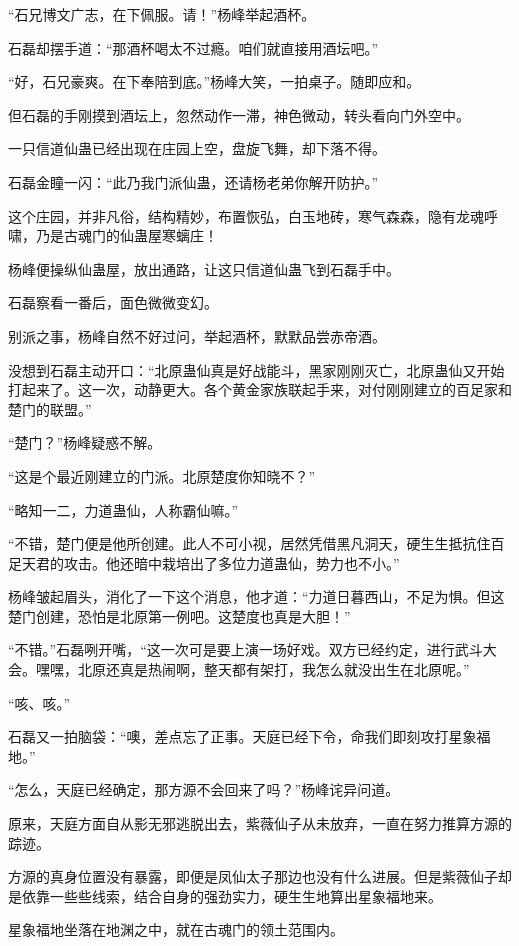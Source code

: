 \begin{this_body}
“石兄博文广志，在下佩服。请！”杨峰举起酒杯。

石磊却摆手道：“那酒杯喝太不过瘾。咱们就直接用酒坛吧。”

“好，石兄豪爽。在下奉陪到底。”杨峰大笑，一拍桌子。随即应和。

但石磊的手刚摸到酒坛上，忽然动作一滞，神色微动，转头看向门外空中。

一只信道仙蛊已经出现在庄园上空，盘旋飞舞，却下落不得。

石磊金瞳一闪：“此乃我门派仙蛊，还请杨老弟你解开防护。”

这个庄园，并非凡俗，结构精妙，布置恢弘，白玉地砖，寒气森森，隐有龙魂呼啸，乃是古魂门的仙蛊屋寒螭庄！

杨峰便操纵仙蛊屋，放出通路，让这只信道仙蛊飞到石磊手中。

石磊察看一番后，面色微微变幻。

别派之事，杨峰自然不好过问，举起酒杯，默默品尝赤帝酒。

没想到石磊主动开口：“北原蛊仙真是好战能斗，黑家刚刚灭亡，北原蛊仙又开始打起来了。这一次，动静更大。各个黄金家族联起手来，对付刚刚建立的百足家和楚门的联盟。”

“楚门？”杨峰疑惑不解。

“这是个最近刚建立的门派。北原楚度你知晓不？”

“略知一二，力道蛊仙，人称霸仙嘛。”

“不错，楚门便是他所创建。此人不可小视，居然凭借黑凡洞天，硬生生抵抗住百足天君的攻击。他还暗中栽培出了多位力道蛊仙，势力也不小。”

杨峰皱起眉头，消化了一下这个消息，他才道：“力道日暮西山，不足为惧。但这楚门创建，恐怕是北原第一例吧。这楚度也真是大胆！”

“不错。”石磊咧开嘴，“这一次可是要上演一场好戏。双方已经约定，进行武斗大会。嘿嘿，北原还真是热闹啊，整天都有架打，我怎么就没出生在北原呢。”

“咳、咳。”

石磊又一拍脑袋：“噢，差点忘了正事。天庭已经下令，命我们即刻攻打星象福地。”

“怎么，天庭已经确定，那方源不会回来了吗？”杨峰诧异问道。

原来，天庭方面自从影无邪逃脱出去，紫薇仙子从未放弃，一直在努力推算方源的踪迹。

方源的真身位置没有暴露，即便是凤仙太子那边也没有什么进展。但是紫薇仙子却是依靠一些些线索，结合自身的强劲实力，硬生生地算出星象福地来。

星象福地坐落在地渊之中，就在古魂门的领土范围内。


\end{this_body}
